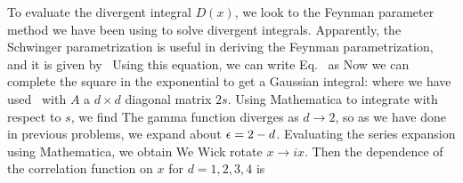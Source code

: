 {	To evaluate the divergent integral $D(x)$, we look to the Feynman parameter method we have been using to solve divergent integrals.  Apparently, the Schwinger parametrization is useful in deriving the Feynman parametrization, and it is given by~\cite{Feynman}
	Using this equation, we can write Eq.~ as
	Now we can complete the square in the exponential to get a Gaussian integral:
	where we have used~\cite{QFT}
	with $A$ a $d \times d$ diagonal matrix $2s$.  Using Mathematica to integrate with respect to $s$, we find
	The gamma function diverges as $d \to 2$, so as we have done in previous problems, we expand about $\epsilon = 2 - d$.  Evaluating the series expansion using Mathematica, we obtain
	We Wick rotate $x \to i x$.  Then the dependence of the correlation function on $x$ for $d = 1, 2, 3, 4$ is
}
